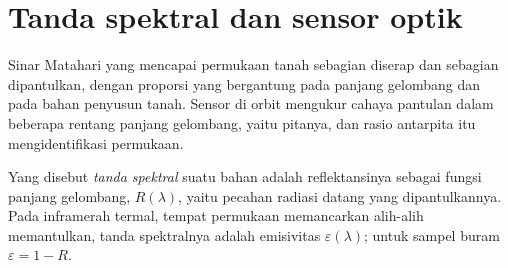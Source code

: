 \section{Tanda spektral dan sensor optik}\label{sec:b3:remote-sensing-gis:optical}

Sinar Matahari yang mencapai permukaan tanah sebagian diserap dan sebagian
dipantulkan, dengan proporsi yang bergantung pada panjang gelombang dan pada
bahan penyusun tanah. Sensor di orbit mengukur cahaya pantulan dalam beberapa
rentang panjang gelombang, yaitu pitanya, dan rasio antarpita itu mengidentifikasi
permukaan.

\begin{definition}\label{def:b3:remote-sensing-gis:signature}
Yang disebut \emph{tanda spektral} suatu bahan adalah
reflektansinya sebagai fungsi panjang gelombang, $R(\lambda)$, yaitu pecahan
radiasi datang yang dipantulkannya. Pada inframerah termal, tempat permukaan
memancarkan alih-alih memantulkan, tanda spektralnya adalah emisivitas
$\varepsilon(\lambda)$; untuk sampel buram $\varepsilon = 1 - R$.
\end{definition}

